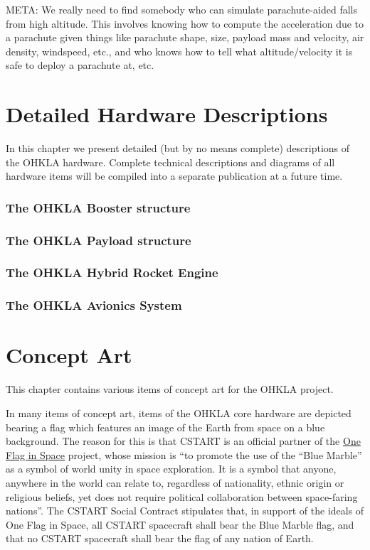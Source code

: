 \documentclass{report}
\begin{document}
META: We really need to find somebody who can simulate parachute-aided falls from high altitude.  This involves knowing how to compute the acceleration due to a parachute given things like parachute shape, size, payload mass and velocity, air density, windspeed, etc., and who knows how to tell what altitude/velocity it is safe to deploy a parachute at, etc.

\chapter{Detailed Hardware Descriptions} \label{chap:detail}

In this chapter we present detailed (but by no means complete) descriptions of the OHKLA hardware.  Complete technical descriptions and diagrams of all hardware items will be compiled into a separate publication at a future time.

\subsection{The OHKLA Booster structure}

\subsection{The OHKLA Payload structure}

\subsection{The OHKLA Hybrid Rocket Engine}

\subsection{The OHKLA Avionics System}

\chapter{Concept Art}

This chapter contains various items of concept art for the OHKLA project.

In many items of concept art, items of the OHKLA core hardware are depicted bearing a flag which features an image of the Earth from space on a blue background.  The reason for this is that CSTART is an official partner of the \href{http://www.oneflaginspace.org}{One Flag in Space} project, whose mission is ``to promote the use of the ``Blue Marble'' as a symbol of world unity in space exploration. It is a symbol that anyone, anywhere in the world can relate to, regardless of nationality, ethnic origin or religious beliefs, yet does not require political collaboration between space-faring nations''.  The CSTART Social Contract stipulates that, in support of the ideals of One Flag in Space, all CSTART spacecraft shall bear the Blue Marble flag, and that no CSTART spacecraft shall bear the flag of any nation of Earth.
\end{document}
